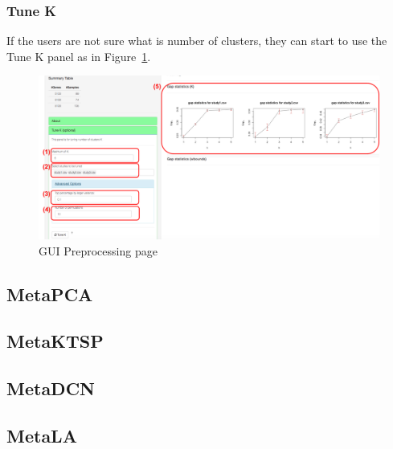 \documentclass{article}
\begin{document}
\subsubsection{Tune K}
If the users are not sure what is number of clusters,
they can start to use the Tune K panel as in Figure~\ref{fig:metaClusttuneK}.
\begin{figure}[H]
\begin{center}
\includegraphics[scale=0.35]{./figure/metaClust/tuneK}
\caption{GUI Preprocessing page}
\label{fig:metaClusttuneK}
\end{center}
\end{figure}



\subsection{MetaPCA}

\subsection{MetaKTSP}

\subsection{MetaDCN}

\subsection{MetaLA}



 
\end{document}
